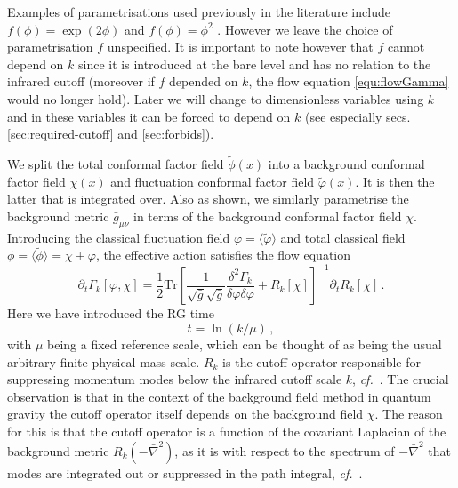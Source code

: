 \documentclass[11pt,a4paper]{article}
\numberwithin{figure}{section}
\numberwithin{equation}{section}
\newcommand\cf{\textit{cf.}\ }
\newcommand{\be}{\begin{equation}}
\newcommand{\ee}{\end{equation}}
\newcommand{\vp}{\varphi}  %
\begin{document}
Examples of parametrisations used previously in the literature include  
$f(\phi) = \exp(2\phi)$ \cite{Machado:2009ph} and $f(\phi)=\phi^2$ \cite{Manrique:2009uh,Bonanno:2012dg}. However we leave the choice of parametrisation $f$ unspecified. It is important to note however that $f$ cannot depend on $k$ since it is introduced at the bare level and has no relation to the infrared cutoff (moreover if $f$ depended on $k$, the flow equation \eqref{equ:flowGamma} would no longer hold).  Later we will change to dimensionless variables using $k$ and in these variables it can be forced to depend on $k$   (see especially secs. \ref{sec:required-cutoff} and \ref{sec:forbids}).

We split the total conformal factor field $\tilde\phi(x)$ into a background conformal factor field $\chi(x)$ and fluctuation conformal factor field $\tilde\vp(x)$. It is then the latter that is integrated over. Also as shown, we similarly parametrise the background metric $\bar{g}_{\mu\nu}$ in terms of the background conformal factor field $\chi$. Introducing the classical fluctuation field $\vp = \langle \tilde \vp \rangle$ and total classical field $\phi = \langle \tilde \phi \rangle = \chi + \vp$, the effective action  satisfies the flow equation
\be
\label{equ:flowGamma}
\partial_t \Gamma_k[\vp,\chi] = \frac{1}{2}\mathrm{Tr}\left[\frac{1}{\sqrt{\bar g}\sqrt{\bar g}}\frac{\delta^2\Gamma_k}
				  {\delta \vp \delta \vp}+ R_k[\chi]\right]^{-1} \partial_t R_k[\chi]\,.
\ee
 Here we have introduced the RG time 
\be
\label{time}
t=\ln(k/\mu)\,,
\ee 
with $\mu$ being a fixed reference scale, which can be thought of as being the usual arbitrary finite physical mass-scale. $R_k$ is the cutoff operator responsible for suppressing momentum modes below the infrared cutoff scale $k$, \cf \cite{Wetterich:1992,Morris:1993}. %
%
The crucial observation is that in the context of the background field method in quantum gravity the cutoff operator itself depends on the background field $\chi$. The reason for this is that the cutoff operator is a function of the covariant Laplacian of the background metric $R_k\left(-\bar \nabla^2\right)$, as it is with respect to the spectrum of $-\bar\nabla^2$ that modes are integrated out or suppressed in the path integral, \cf \cite{Reuter:2008wj,Reuter:2009kq}. 
\end{document}
